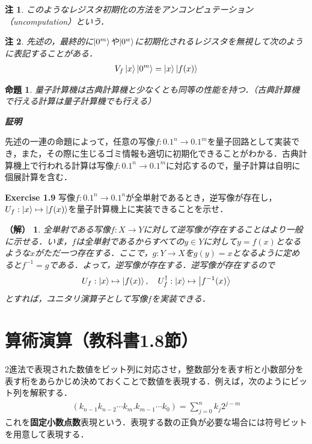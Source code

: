 \documentclass[dvipdfmx]{jarticle}
\makeatletter
\numberwithin{equation}{section}
\renewenvironment{proof}[1][\proofname]{\par
  \pushQED{\qed}
  \normalfont \topsep6\p@\@plus6\p@\relax
  \trivlist
  \item\relax
  {\itshape
  #1\@addpunct{ }}\hspace\labelsep\ignorespaces
}{
  \popQED\endtrivlist\@endpefalse
}
\theoremstyle{seminar}
\newtheorem{proposition}{命題}[section]
\newtheorem{remark}{注}[section]
\newtheorem*{solution}{（解）}
\renewcommand{\proofname}{\textbf{証明}}
\makeatother
\begin{document}
\begin{remark}
  このようなレジスタ初期化の方法をアンコンピュテーション（uncomputation）という．
\end{remark}
\begin{remark}
  先述の，最終的に$\ket{0^m}$や$\ket{0^w}$に初期化されるレジスタを無視して次のように表記することがある．
  \begin{align}
    V_f \ket{x}\ket{0^m} = \ket{x}\ket{f(x)}
  \end{align}
\end{remark}
\begin{proposition}
  量子計算機は古典計算機と少なくとも同等の性能を持つ．（古典計算機で行える計算は量子計算機でも行える）
\end{proposition}

\begin{proof}
  先述の一連の命題によって，任意の写像$f: \qty{0, 1}^n \rightarrow \qty{0, 1}^m$を量子回路として実装でき，また，その際に生じるゴミ情報も適切に初期化できることがわかる．古典計算機上で行われる計算は写像$f:\qty{0, 1}^n \rightarrow \qty{0, 1}^m$に対応するので，量子計算は自明に個展計算を含む．
\end{proof}

\begin{gray}
  {\bf Exercise 1.9} \hspace{1em} 写像$f: \qty{0, 1}^n \rightarrow \qty{0, 1}^n$が全単射であるとき，逆写像が存在し，$U_f: \ket{x} \mapsto \ket{f(x)}$を量子計算機上に実装できることを示せ．
\end{gray}

\begin{solution}
  全単射である写像$f: X \rightarrow Y$に対して逆写像が存在することはより一般に示せる．いま，$f$は全単射であるからすべての$y \in Y$に対して$y = f(x)$となるような$x$がただ一つ存在する．ここで，$g: Y \rightarrow X$を$g(y) = x$となるように定めると$f^{-1} = g$である．よって，逆写像が存在する．逆写像が存在するので
  \begin{align}
    U_f: \ket{x} \mapsto \ket{f(x)}, \quad  U^\dagger_f : \ket{x} \mapsto \ket{f^{-1}(x)}
  \end{align}
  とすれば，ユニタリ演算子として写像$f$を実装できる．
\end{solution}

\section{算術演算（教科書1.8節）}
2進法で表現された数値をビット列に対応させ，整数部分を表す桁と小数部分を表す桁をあらかじめ決めておくことで数値を表現する．例えば，次のようにビット列を解釈する．
\begin{align}
  (k_{n-1}k_{n-2} \cdots k_{m} . k_{m -1} \cdots k_0) = \sum_{j = 0}^{n} k_j 2^{j - m}
\end{align}
これを{\bf 固定小数点数}表現という．表現する数の正負が必要な場合には符号ビットを用意して表現する．
\end{document}
